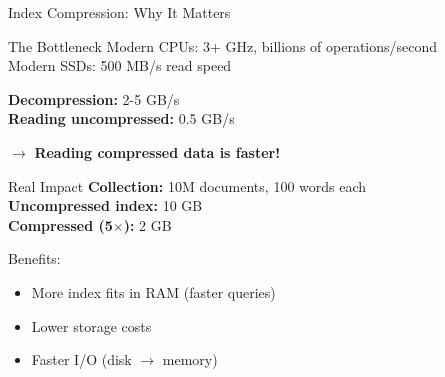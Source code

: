 \documentclass[aspectratio=169]{beamer}
\begin{document}
\begin{frame}[shrink=10]{Index Compression: Why It Matters}
\begin{block}{The Bottleneck}
Modern CPUs: 3+ GHz, billions of operations/second \\
Modern SSDs: 500 MB/s read speed

\vspace{0.5em}

\textbf{Decompression:} 2-5 GB/s \\
\textbf{Reading uncompressed:} 0.5 GB/s

\vspace{0.5em}

$\rightarrow$ \textbf{Reading compressed data is faster!}
\end{block}

\vspace{1em}

\begin{exampleblock}{Real Impact}
\textbf{Collection:} 10M documents, 100 words each \\
\textbf{Uncompressed index:} 10 GB \\
\textbf{Compressed (5$\times$):} 2 GB

\vspace{0.5em}

Benefits:
\begin{itemize}
    \item More index fits in RAM (faster queries)
    \item Lower storage costs
    \item Faster I/O (disk $\rightarrow$ memory)
\end{itemize}
\end{exampleblock}
\end{frame}
\end{document}
